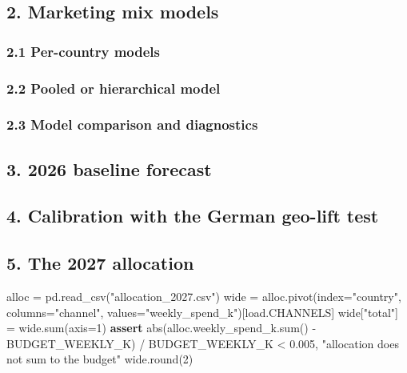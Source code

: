 \documentclass[
  letterpaper,
  DIV=11,
  numbers=noendperiod]{scrartcl}
\newenvironment{Shaded}{\begin{snugshade}}{\end{snugshade}}
\newcommand{\BuiltInTok}[1]{\textcolor[rgb]{0.00,0.23,0.31}{#1}}
\newcommand{\ControlFlowTok}[1]{\textcolor[rgb]{0.00,0.23,0.31}{\textbf{#1}}}
\newcommand{\DecValTok}[1]{\textcolor[rgb]{0.68,0.00,0.00}{#1}}
\newcommand{\FloatTok}[1]{\textcolor[rgb]{0.68,0.00,0.00}{#1}}
\newcommand{\NormalTok}[1]{\textcolor[rgb]{0.00,0.23,0.31}{#1}}
\newcommand{\OperatorTok}[1]{\textcolor[rgb]{0.37,0.37,0.37}{#1}}
\newcommand{\StringTok}[1]{\textcolor[rgb]{0.13,0.47,0.30}{#1}}
\begin{document}
\subsection{2. Marketing mix models}\label{marketing-mix-models}

\subsubsection{2.1 Per-country models}\label{per-country-models}

\subsubsection{2.2 Pooled or hierarchical
model}\label{pooled-or-hierarchical-model}

\subsubsection{2.3 Model comparison and
diagnostics}\label{model-comparison-and-diagnostics}

\subsection{3. 2026 baseline forecast}\label{baseline-forecast}

\subsection{4. Calibration with the German geo-lift
test}\label{calibration-with-the-german-geo-lift-test}

\subsection{5. The 2027 allocation}\label{the-2027-allocation}

\begin{Shaded}
\begin{Highlighting}[]
\NormalTok{alloc }\OperatorTok{=}\NormalTok{ pd.read\_csv(}\StringTok{"allocation\_2027.csv"}\NormalTok{)}
\NormalTok{wide }\OperatorTok{=}\NormalTok{ alloc.pivot(index}\OperatorTok{=}\StringTok{"country"}\NormalTok{, columns}\OperatorTok{=}\StringTok{"channel"}\NormalTok{, values}\OperatorTok{=}\StringTok{"weekly\_spend\_k"}\NormalTok{)[load.CHANNELS]}
\NormalTok{wide[}\StringTok{"total"}\NormalTok{] }\OperatorTok{=}\NormalTok{ wide.}\BuiltInTok{sum}\NormalTok{(axis}\OperatorTok{=}\DecValTok{1}\NormalTok{)}
\ControlFlowTok{assert} \BuiltInTok{abs}\NormalTok{(alloc.weekly\_spend\_k.}\BuiltInTok{sum}\NormalTok{() }\OperatorTok{{-}}\NormalTok{ BUDGET\_WEEKLY\_K) }\OperatorTok{/}\NormalTok{ BUDGET\_WEEKLY\_K }\OperatorTok{\textless{}} \FloatTok{0.005}\NormalTok{, }\StringTok{"allocation does not sum to the budget"}
\NormalTok{wide.}\BuiltInTok{round}\NormalTok{(}\DecValTok{2}\NormalTok{)}
\end{Highlighting}
\end{Shaded}
\end{document}
